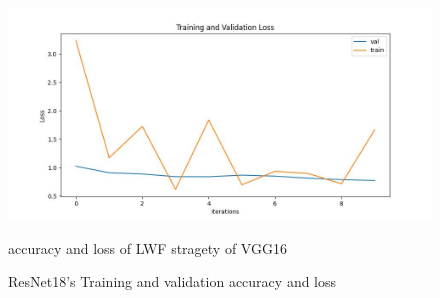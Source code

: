 \documentclass[lang=english,inputenc=utf8,fontsize=10pt]{ldvarticle}
\begin{document}
\begin{appendices}
\begin{center}
\begin{enumerate}
\begin{figure}[H]
{        \includegraphics[scale=0.27]{conV22.png}}
        \caption{accuracy and loss of LWF stragety of VGG16}
        \end{figure}
        \begin{figure}[H]
        \centering
        \caption{ResNet18's Training and validation accuracy and loss}
        \end{figure}    

\end{enumerate}

\end{center} 
\end{appendices}
\end{document}
